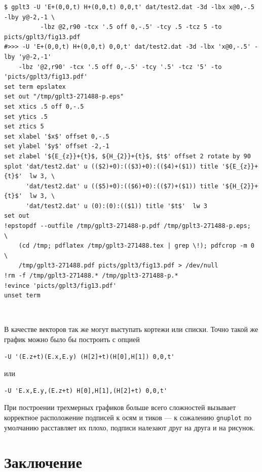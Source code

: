 \documentclass[12pt]{article}
\def\gnuplot{{\tt gnuplot}}
\begin{document}
\vspace{3mm}
\noindent
{\small
\begin{verbatim}
$ gplt3 -U 'E+(0,0,t) H+(0,0,t) 0,0,t' dat/test2.dat -3d -lbx x@0,-.5 -lby y@-2,-1 \
          -lbz @2,r90 -tcx '.5 off 0,-.5' -tcy .5 -tcz 5 -to picts/gplt3/fig13.pdf
#>>> -U 'E+(0,0,t) H+(0,0,t) 0,0,t' dat/test2.dat -3d -lbx 'x@0,-.5' -lby 'y@-2,-1' 
    -lbz '@2,r90' -tcx '.5 off 0,-.5' -tcy '.5' -tcz '5' -to 'picts/gplt3/fig13.pdf'
set term epslatex 
set out "/tmp/gplt3-271488-p.eps"
set xtics .5 off 0,-.5
set ytics .5
set ztics 5
set xlabel '$x$' offset 0,-.5
set ylabel '$y$' offset -2,-1
set zlabel '${E_{z}}+{t}$, ${H_{2}}+{t}$, $t$' offset 2 rotate by 90
splot 'dat/test2.dat' u (($2)+0):(($3)+0):(($4)+($1)) title '${E_{z}}+{t}$'  lw 3, \
      'dat/test2.dat' u (($5)+0):(($6)+0):(($7)+($1)) title '${H_{2}}+{t}$'  lw 3, \
      'dat/test2.dat' u (0):(0):(($1)) title '$t$'  lw 3 
set out
!epstopdf --outfile /tmp/gplt3-271488-p.pdf /tmp/gplt3-271488-p.eps;               \
    (cd /tmp; pdflatex /tmp/gplt3-271488.tex | grep \!); pdfcrop -m 0              \
    /tmp/gplt3-271488.pdf picts/gplt3/fig13.pdf > /dev/null
!rm -f /tmp/gplt3-271488.* /tmp/gplt3-271488-p.*
!evince 'picts/gplt3/fig13.pdf'
unset term
\end{verbatim}
  }
\vspace{-1cm}
\begin{center}
\\[3mm]
\end{center}
В качестве векторов так же могут выступать кортежи или списки. Точно такой же график можно было бы построить с опцией
\begin{verbatim}
-U '(E.z+t)(E.x,E.y) (H[2]+t)(H[0],H[1]) 0,0,t'
\end{verbatim}
или
\begin{verbatim}
-U 'E.x,E.y,(E.z+t) H[0],H[1],(H[2]+t) 0,0,t'
\end{verbatim}
При построении трехмерных графиков больше всего сложностей
вызывает корректное расположение подписей к осям и тиков --- к сожалению \gnuplot{} по умолчанию расставляет их плохо, подписи
налезают друг на друга и на рисунок.

\newpage
\section{Заключение}
\begin{figure}
  \vphantom{.}

  \vspace{-2.3cm}
\end{figure}
\end{document}
